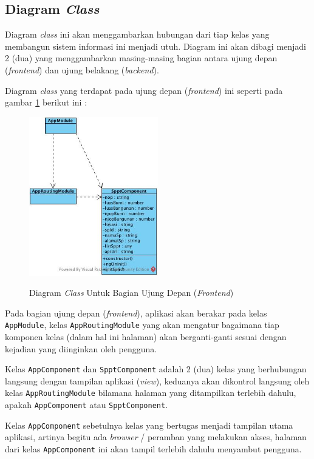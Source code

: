 \documentclass[pdftex,12pt, oneside]{article}
\begin{document}
\subsection{Diagram \textit{Class}}

Diagram \textit{class} ini akan menggambarkan hubungan dari tiap kelas yang membangun sistem informasi ini menjadi utuh. Diagram ini akan dibagi menjadi 2 (dua) yang menggambarkan masing-masing bagian antara ujung depan (\textit{frontend}) dan ujung belakang (\textit{backend}).

Diagram \textit{class} yang terdapat pada ujung depan (\textit{frontend}) ini seperti pada gambar \ref{fig:class-dia-fe} berikut ini :

\begin{figure}[H]
	\centering
	\includegraphics[width=0.5\textwidth]{./resources/class-diagram-fe}
	\label{fig:class-dia-fe}
	\caption{Diagram \textit{Class} Untuk Bagian Ujung Depan (\textit{Frontend})}
\end{figure}

Pada bagian ujung depan (\textit{frontend}), aplikasi akan berakar pada kelas \texttt{AppModule}, kelas \texttt{AppRoutingModule} yang akan mengatur bagaimana tiap komponen kelas (dalam hal ini halaman) akan berganti-ganti sesuai dengan kejadian yang diinginkan oleh pengguna.

Kelas \texttt{AppComponent} dan \texttt{SpptComponent} adalah 2 (dua) kelas yang berhubungan langsung dengan tampilan aplikasi (\textit{view}), keduanya akan dikontrol langsung oleh kelas \texttt{AppRoutingModule} bilamana halaman yang ditampilkan terlebih dahulu, apakah \texttt{AppComponent} atau \texttt{SpptComponent}.

Kelas \texttt{AppComponent} sebetulnya kelas yang bertugas menjadi tampilan utama aplikasi, artinya begitu ada \textit{browser} / peramban yang melakukan akses, halaman dari kelas \texttt{AppComponent} ini akan tampil terlebih dahulu menyambut pengguna.
\end{document}
